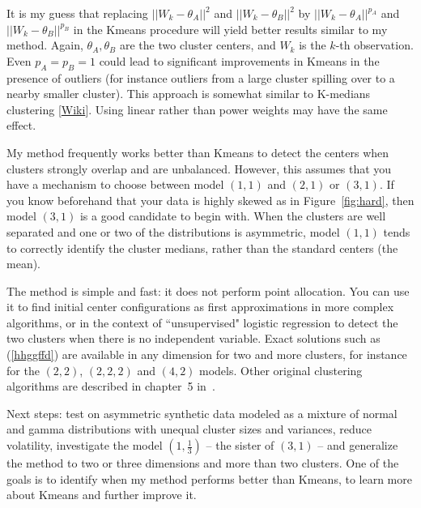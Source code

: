 \documentclass[oneside,10pt]{book}
\begin{document}
It is my guess that replacing $||W_k-\theta_A||^2$ and $||W_k-\theta_B||^2$
by $||W_k-\theta_A||^{p_A}$ and $||W_k-\theta_B||^{p_B}$
 in the Kmeans procedure will yield better results similar to my method. Again, $\theta_A, \theta_B$ are the two cluster centers, and $W_k$ is
 the $k$-th observation. Even $p_A=p_B=1$ could lead to significant improvements in Kmeans in the presence of outliers (for instance outliers from
 a large cluster spilling over to a nearby smaller cluster).
This approach is somewhat similar to \textcolor{index}{K-medians clustering} [\href{https://en.wikipedia.org/wiki/K-medians_clustering}{Wiki}]. Using linear rather than power weights may have the same effect. \vspace{1ex}


\noindent My method frequently works better than Kmeans to detect the centers when clusters strongly overlap and are unbalanced. However, this assumes that you have a
mechanism to choose between model $(1, 1)$ and $(2, 1)$ or $(3, 1)$.  If you know beforehand that your data is highly skewed as in
 Figure~\ref{fig:hard}, then model $(3, 1)$ is a good candidate to begin with. When the clusters are well separated and one or two of the distributions is asymmetric,
 model $(1, 1)$ tends to correctly identify the cluster medians, rather than the standard centers (the mean).

The method is simple and fast:  it does not perform point allocation. You can use it to find initial center configurations as first
 approximations in more complex algorithms, or in the context of ``unsupervised"
\textcolor{index}{logistic regression} to detect the two clusters when there is no independent variable.  Exact solutions such as (\ref{hhggffd}) are available in any dimension for two and more clusters, for instance for the $(2, 2)$, $(2,2,2)$ and $(4, 2)$ models. Other original clustering algorithms are described in
 chapter~5 in~\cite{vgelsevier}.

Next steps: test on asymmetric synthetic data modeled as a mixture of normal and gamma distributions with unequal cluster sizes and variances, reduce volatility, investigate the model $(1, \frac{1}{3})$ -- the sister of $(3, 1)$ -- and generalize the method to two or three dimensions and more than two clusters. One of the goals is to identify when my method performs better than Kmeans, to learn more about Kmeans and further improve it.
\end{document}
